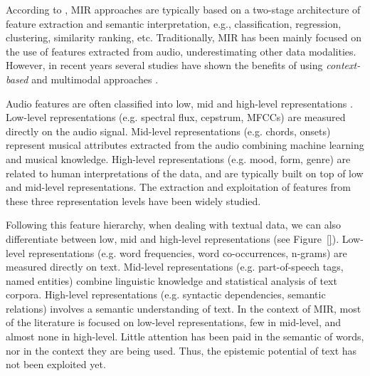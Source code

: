 According to \cite{humphrey2012}, MIR approaches are typically based on a two-stage architecture of feature extraction and semantic interpretation, e.g., classification, regression, clustering, similarity ranking, etc. 
Traditionally, MIR has been mainly focused on the use of features extracted from audio, underestimating other data modalities. However, in recent years several studies have shown the benefits of using \textit{context-based} and multimodal approaches \cite{Schedl2014}. 

Audio features are often classified into low, mid and high-level representations \cite{bello2015}. Low-level representations (e.g. spectral flux, cepstrum, MFCCs) are measured directly on the audio signal. Mid-level representations (e.g. chords, onsets) represent musical attributes extracted from the audio combining machine learning and musical knowledge. High-level representations (e.g. mood, form, genre) are related to human interpretations of the data, and are typically built on top of low and mid-level representations. The extraction and exploitation of features from these three representation levels have been widely studied. 

Following this feature hierarchy, when dealing with textual data, we can also differentiate between low, mid and high-level representations (see Figure~\ref{}). Low-level representations (e.g. word frequencies, word co-occurrences, n-grams) are measured directly on text. Mid-level representations (e.g. part-of-speech tags, named entities) combine linguistic knowledge and statistical analysis of text corpora. High-level representations (e.g. syntactic dependencies, semantic relations) involves a semantic understanding of text. In the context of MIR, most of the literature is focused on low-level representations, few in mid-level, and almost none in high-level. Little attention has been paid in the semantic of words, nor in the context they are being used. Thus, the epistemic potential of text has not been exploited yet.


